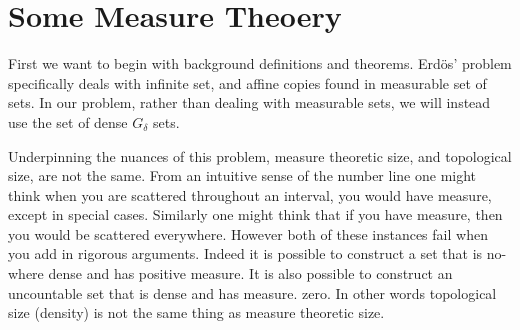 \section{Some Measure Theoery}

First we want to begin with background definitions and theorems.  Erd\"{o}s' problem specifically deals with infinite set, and affine copies found in measurable set of sets.  In our problem, rather than dealing with measurable sets, we will instead use the set of dense $G_\delta$ sets.  

Underpinning the nuances of this problem, measure theoretic size, and topological size, are not the same. From an intuitive sense of the number line one might think when you are scattered throughout an interval, you would have measure, except in special cases. Similarly one might think that if you have measure, then you would be scattered everywhere.  However both of these instances fail when you add in rigorous arguments.  Indeed it is possible to construct a set that is no-where dense and has positive measure.  It is also possible to construct an uncountable set that is dense and has measure. zero.
 In other words topological size (density) is not the same thing as measure theoretic size. 


